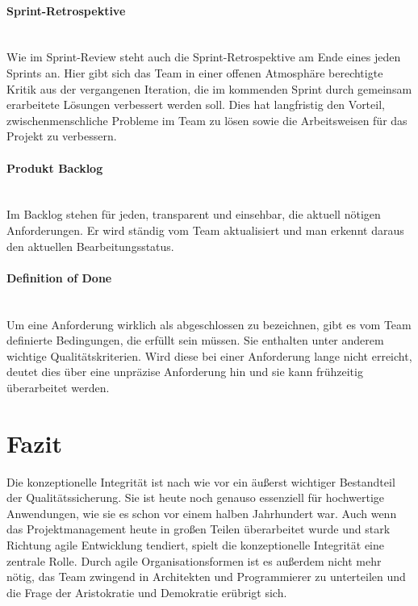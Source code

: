 \documentclass[a4paper, ngerman, 12pt, usenames, dvipsnames]{article}
\begin{document}
    \paragraph{Sprint-Retrospektive}\mbox{} \\
    Wie im Sprint-Review steht auch die Sprint-Retrospektive am Ende eines jeden Sprints an. Hier gibt sich das Team in einer offenen Atmosphäre berechtigte Kritik aus der vergangenen Iteration, die im kommenden Sprint durch gemeinsam erarbeitete Lösungen verbessert werden soll.
    Dies hat langfristig den Vorteil, zwischenmenschliche Probleme im Team zu lösen sowie die Arbeitsweisen für das Projekt zu verbessern.
    \paragraph{Produkt Backlog}\mbox{} \\
    Im Backlog stehen für jeden, transparent und einsehbar, die aktuell nötigen Anforderungen. 
    Er wird ständig vom Team aktualisiert und man erkennt daraus den aktuellen Bearbeitungsstatus.
    \paragraph{Definition of Done}\mbox{} \\
    Um eine Anforderung wirklich als abgeschlossen zu bezeichnen, gibt es vom Team definierte Bedingungen, die erfüllt sein müssen.
    Sie enthalten unter anderem wichtige Qualitätskriterien. Wird diese bei einer Anforderung lange nicht erreicht, deutet dies über eine unpräzise Anforderung hin und sie kann frühzeitig überarbeitet werden.

\section{Fazit}
    Die konzeptionelle Integrität ist nach wie vor ein äußerst wichtiger Bestandteil der Qualitätssicherung. Sie ist heute noch genauso essenziell für hochwertige Anwendungen, wie sie es schon vor einem halben Jahrhundert war. Auch wenn das Projektmanagement heute in großen Teilen überarbeitet wurde und stark Richtung agile Entwicklung tendiert, spielt die konzeptionelle Integrität eine zentrale Rolle. Durch agile Organisationsformen ist es außerdem nicht mehr nötig, das Team zwingend in Architekten und Programmierer zu unterteilen und die Frage der Aristokratie und Demokratie erübrigt sich.


\end{document}
